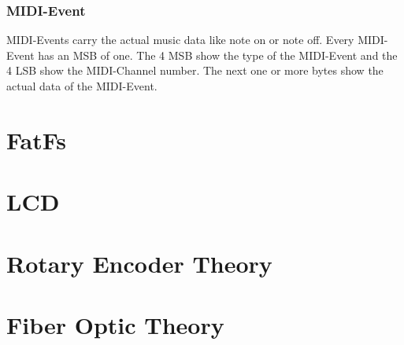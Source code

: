 \subsubsection{MIDI-Event}

MIDI-Events carry the actual music data like note on or note off. Every MIDI-Event has an MSB of one. The 4 MSB show the type of the MIDI-Event and the 4 LSB show the MIDI-Channel number. The next one or more bytes show the actual data of the MIDI-Event.

\section{FatFs}


\section{LCD}


\section{Rotary Encoder Theory}

\section{Fiber Optic Theory}